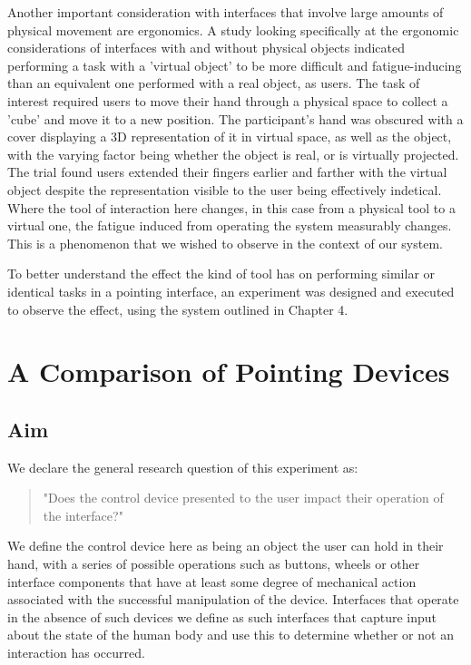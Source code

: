 Another important consideration with interfaces that involve large amounts of physical movement are ergonomics. A study looking specifically at the ergonomic considerations of interfaces with and without physical objects \cite{KimEtAl2011} indicated performing a task with a 'virtual object' to be more difficult and fatigue-inducing than an equivalent one performed with a real object, as users. The task of interest required users to move their hand through a physical space to collect a 'cube' and move it to a new position. The participant's hand was obscured with a cover displaying a 3D representation of it in virtual space, as well as the object, with the varying factor being whether the object is real, or is virtually projected. The trial found users extended their fingers earlier and farther with the virtual object despite the representation visible to the user being effectively indetical. Where the tool of interaction here changes, in this case from a physical tool to a virtual one, the fatigue induced from operating the system measurably changes. This is a phenomenon that we wished to observe in the context of our system.

To better understand the effect the kind of tool has on performing similar or identical tasks in a pointing interface, an experiment was designed and executed to observe the effect, using the system outlined in Chapter 4.

\section{A Comparison of Pointing Devices}

\subsection{Aim}

We declare the general research question of this experiment as: 
\begin{quote}

"Does the control device presented to the user impact their operation of the interface?"

\end{quote}
We define the control device here as being an object the user can hold in their hand, with a series of possible operations such as buttons, wheels or other interface components that have at least some degree of mechanical action associated with the successful manipulation of the device. Interfaces that operate in the absence of such devices we define as such interfaces that capture input about the state of the human body and use this to determine whether or not an interaction has occurred.

